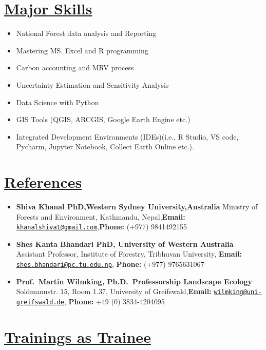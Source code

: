 \documentclass[
]{article}
\providecommand{\tightlist}{%
  \setlength{\itemsep}{0pt}\setlength{\parskip}{0pt}}
\begin{document}
\section{\texorpdfstring{\underline{Major Skills}}{}}\label{section-5}

\begin{itemize}
\tightlist
\item
  National Forest data analysis and Reporting
\item
  Mastering MS. Excel and R programming
\item
  Carbon accounting and MRV process
\item
  Uncertainty Estimation and Sensitivity Analysis
\item
  Data Science with Python
\item
  GIS Tools (QGIS, ARCGIS, Google Earth Engine etc.)
\item
  Integrated Development Environments (IDEs)(i.e., R Studio, VS code,
  Pycharm, Jupyter Notebook, Collect Earth Online etc.).
\end{itemize}

\section{\texorpdfstring{\underline{References}}{}}\label{section-6}

\begin{itemize}
\item
  \textbf{Shiva Khanal PhD,Western Sydney University,Australia} Ministry
  of Forests and Environment, Kathmandu, Nepal,\textbf{Email:}
  \href{mailto:khanalshiva1@gmail.com}{\nolinkurl{khanalshiva1@gmail.com}},\textbf{Phone:}
  (+977) 9841492155
\item
  \textbf{Shes Kanta Bhandari PhD, University of Western Australia}
  Assistant Professor, Institute of Forestry, Tribhuvan University,
  \textbf{Email:}
  \href{mailto:shes.bhandari@pc.tu.edu.np}{\nolinkurl{shes.bhandari@pc.tu.edu.np}},
  \textbf{Phone:} (+977) 9765631067
\item
  \textbf{Prof.~Martin Wilmking, Ph.D.~Professorship Landscape Ecology}
  Soldmannstr. 15, Room 1.37, University of Greifswald,\textbf{Email:}
  \href{mailto:wilmking@uni-greifswald.de}{\nolinkurl{wilmking@uni-greifswald.de}},
  \textbf{Phone:} +49 (0) 3834-4204095
\end{itemize}

\newpage

\section{\texorpdfstring{\underline{Trainings as Trainee}}{}}\label{section-7}
\end{document}
